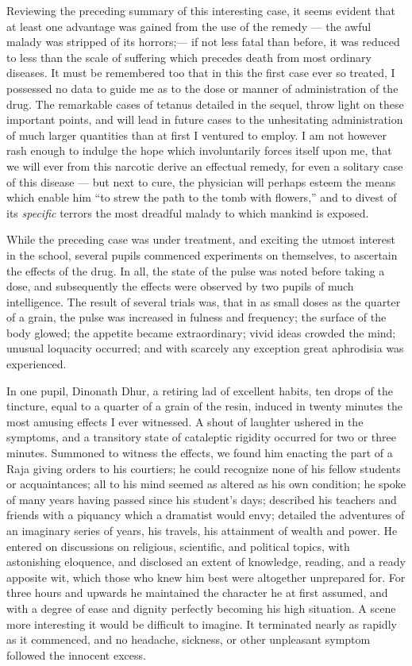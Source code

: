 \documentclass[a4paper, 11pt, oneside, polutonikogreek, english]{article}
\begin{document}
Reviewing the preceding summary of this interesting case, it seems evident that at least one advantage was gained from the use of the remedy --- the awful malady was stripped of its horrors;--- if not less fatal than before, it was reduced to less than the scale of suffering which precedes death from most ordinary diseases. It must be remembered too that in this the first case ever so treated, I possessed no data to guide me as to the dose or manner of administration of the drug. The remarkable cases of tetanus detailed in the sequel, throw light on these important points, and will lead in future cases to the unhesitating administration of much larger quantities than at first I ventured to employ. I am not however rash enough to indulge the hope which involuntarily forces itself upon me, that we will ever from this narcotic derive an effectual remedy, for even a solitary case of this disease --- but next to cure, the physician will perhaps esteem the means which enable him ``to strew the path to the tomb with flowers,'' and to divest of its \emph{specific} terrors the most dreadful malady to which mankind is exposed.

While the preceding case was under treatment, and exciting the utmost interest in the school, several pupils commenced experiments on themselves, to ascertain the effects of the drug. In all, the state of the pulse was noted before taking a dose, and subsequently the effects were observed by two pupils of much intelligence. The result of several trials was, that in as small doses as the quarter of a grain, the pulse was increased in fulness and frequency; the surface of the body glowed; the appetite became extraordinary; vivid ideas crowded the mind; unusual loquacity occurred; and with scarcely any exception great aphrodisia was experienced.

In one pupil, Dinonath Dhur, a retiring lad of excellent habits, ten drops of the tincture, equal to a quarter of a grain of the resin, induced in twenty minutes the most amusing effects I ever witnessed. A shout of laughter ushered in the symptoms, and a transitory state of cataleptic rigidity occurred for two or three minutes. Summoned to witness the effects, we found him enacting the part of a Raja giving orders to his courtiers; he could recognize none of his fellow students or acquaintances; all to his mind seemed as altered as his own condition; he spoke of many years having passed since his student's days; described his teachers and friends with a piquancy which a dramatist would envy; detailed the adventures of an imaginary series of years, his travels, his attainment of wealth and power. He entered on discussions on religious, scientific, and political topics, with astonishing eloquence, and disclosed an extent of knowledge, reading, and a ready apposite wit, which those who knew him best were altogether unprepared for. For three hours and upwards he maintained the character he at first assumed, and with a degree of ease and dignity perfectly becoming his high situation. A scene more interesting it would be difficult to imagine. It terminated nearly as rapidly as it commenced, and no headache, sickness, or other unpleasant symptom followed the innocent excess.
\end{document}
